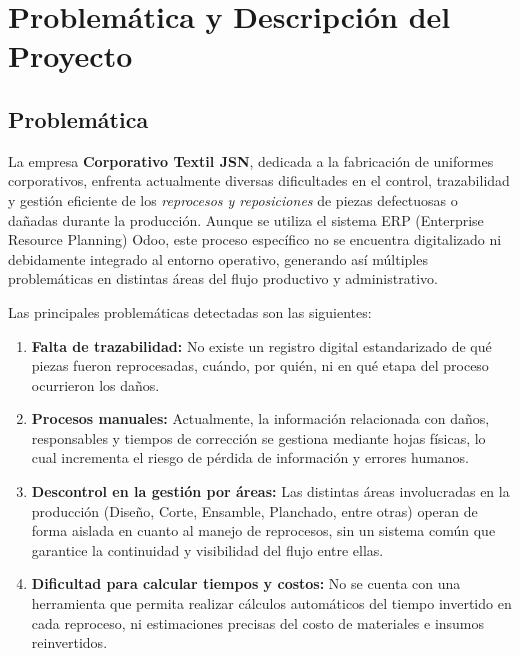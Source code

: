 \documentclass[12pt,letterpaper,spanish]{report}
\begin{document}
\chapter{Problemática y Descripción del Proyecto}
\newpage

\section{Problemática}

La empresa \textbf{Corporativo Textil JSN}, dedicada a la fabricación de uniformes corporativos, enfrenta actualmente diversas dificultades en el control, trazabilidad y gestión eficiente de los \textit{reprocesos y reposiciones} de piezas defectuosas o dañadas durante la producción. Aunque se utiliza el sistema ERP (Enterprise Resource Planning) Odoo, este proceso específico no se encuentra digitalizado ni debidamente integrado al entorno operativo, generando así múltiples problemáticas en distintas áreas del flujo productivo y administrativo.

Las principales problemáticas detectadas son las siguientes:

\begin{enumerate}
    \item \textbf{Falta de trazabilidad:} No existe un registro digital estandarizado de qué piezas fueron reprocesadas, cuándo, por quién, ni en qué etapa del proceso ocurrieron los daños.
    
    \item \textbf{Procesos manuales:} Actualmente, la información relacionada con daños, responsables y tiempos de corrección se gestiona mediante hojas físicas, lo cual incrementa el riesgo de pérdida de información y errores humanos.
    
    \item \textbf{Descontrol en la gestión por áreas:} Las distintas áreas involucradas en la producción (Diseño, Corte, Ensamble, Planchado, entre otras) operan de forma aislada en cuanto al manejo de reprocesos, sin un sistema común que garantice la continuidad y visibilidad del flujo entre ellas.
    
    \item \textbf{Dificultad para calcular tiempos y costos:} No se cuenta con una herramienta que permita realizar cálculos automáticos del tiempo invertido en cada reproceso, ni estimaciones precisas del costo de materiales e insumos reinvertidos.

\end{enumerate}
\end{document}
